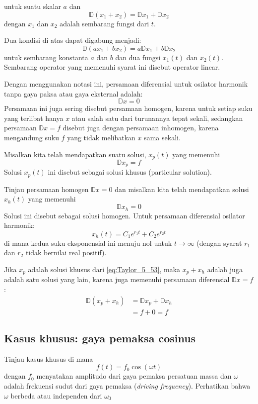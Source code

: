 untuk suatu skalar $a$ dan
\[
\mathbb{D}(x_{1} + x_{2}) = \mathbb{D}x_{1} + \mathbb{D}x_{2}
\]
dengan $x_{1}$ dan $x_{2}$ adalah sembarang fungsi dari $t$.

Dua kondisi di atas dapat digabung menjadi:
\[
\mathbb{D}(ax_{1}+bx_{2})=a\mathbb{D}x_{1}+b\mathbb{D}x_{2}
\]
untuk sembarang konstanta $a$ dan $b$ dan dua fungsi $x_{1}(t)$
dan $x_{2}(t)$. Sembarang operator yang memenuhi syarat ini disebut
operator linear.

Dengan menggunakan notasi ini, persamaan diferensial untuk osilator
harmonik tanpa gaya paksa atau gaya eksternal adalah:
\[
\mathbb{D}x = 0
\]
Persamaan ini juga sering disebut persamaan homogen, karena untuk
setiap suku yang terlibat hanya $x$ atau salah satu dari turunannya
tepat sekali, sedangkan persamaan $\mathbb{D}x=f$ disebut juga dengan
persamaan inhomogen, karena mengandung suku $f$ yang tidak melibatkan
$x$ sama sekali.

Misalkan kita telah mendapatkan suatu solusi, $x_{p}(t)$ yang memenuhi
\begin{equation}
\mathbb{D}x_{p} = f
\label{eq:Taylor_5_53}
\end{equation}
Solusi $x_{p}(t)$ ini disebut sebagai solusi khusus (particular solution).

Tinjau persamaan homogen $\mathbb{D}x=0$ dan misalkan kita telah
mendapatkan solusi $x_{h}(t)$ yang memenuhi
\[
\mathbb{D}x_{h}=0
\]
Solusi ini disebut sebagai solusi homogen. Untuk persamaan diferensial
osilator harmonik:
\[
x_{h}(t)=C_{1}e^{r_{1}t}+C_{2}e^{r_{2}t}
\]
di mana kedua suku eksponensial ini menuju nol untuk $t\rightarrow\infty$
(dengan syarat $r_{1}$ dan $r_{2}$ tidak bernilai real positif).

Jika $x_{p}$ adalah solusi khusus dari \ref{eq:Taylor_5_53}, maka
$x_{p}+x_{h}$ adalah juga adalah satu solusi yang lain, karena juga
memenuhi persamaan diferensial $\mathbb{D}x=f$:
\begin{align*}
\mathbb{D}(x_{p}+x_{h}) & =\mathbb{D}x_{p}+\mathbb{D}x_{h}\\
 & =f + 0 = f
\end{align*}


\subsection{Kasus khusus: gaya pemaksa cosinus}

Tinjau kasus khusus di mana
\begin{equation}
f(t) = f_{0}\cos(\omega t)
\end{equation}
dengan $f_{0}$ menyatakan amplitudo dari gaya pemaksa persatuan massa
dan $\omega$ adalah frekuensi sudut dari gaya pemaksa (\textit{driving frequency}).
Perhatikan bahwa $\omega$ berbeda atau independen dari $\omega_0$

